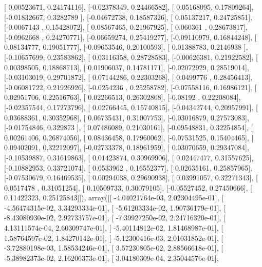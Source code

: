 \documentclass{article}
\begin{document}
       [ 0.00523671,  0.24174116],
       [-0.02378349,  0.24466582],
       [ 0.05168095,  0.17809264],
       [-0.01832667,  0.3282789 ],
       [-0.04672738,  0.18587326],
       [ 0.05137217,  0.24725851],
       [-0.0067143 ,  0.15428072],
       [ 0.08567465,  0.21967925],
       [ 0.060361  ,  0.28673817],
       [-0.0962668 ,  0.24270771],
       [-0.06659274,  0.25419277],
       [-0.09110979,  0.16844248],
       [ 0.08134777,  0.19051777],
       [-0.09653546,  0.20100593],
       [ 0.01388783,  0.2146938 ],
       [-0.10657699,  0.23583862],
       [ 0.03116358,  0.28728583],
       [-0.00626381,  0.21922582],
       [ 0.00398505,  0.18868713],
       [ 0.01906037,  0.14781171],
       [-0.02072929,  0.28519014],
       [-0.03103019,  0.29701872],
       [ 0.07144286,  0.22303268],
       [ 0.0499776 ,  0.28456413],
       [-0.06081722,  0.21926926],
       [-0.0254236 ,  0.25258782],
       [-0.07558116,  0.16986121],
       [ 0.02951706,  0.22516763],
       [ 0.02266513,  0.26302808],
       [-0.08192   ,  0.22208084],
       [-0.02357544,  0.17273796],
       [ 0.02766445,  0.15740815],
       [-0.04342744,  0.20957991],
       [ 0.03688361,  0.30352968],
       [ 0.06735431,  0.31007753],
       [-0.03016879,  0.27573083],
       [-0.01754846,  0.329873  ],
       [ 0.07486089,  0.21030161],
       [-0.09548831,  0.32254854],
       [ 0.00261406,  0.26874056],
       [ 0.08436458,  0.17960062],
       [-0.07531525,  0.15404465],
       [ 0.09402091,  0.32212097],
       [-0.02733378,  0.18961959],
       [ 0.03070659,  0.29347084],
       [-0.10539887,  0.31619863],
       [ 0.01423874,  0.30969906],
       [ 0.02447477,  0.31557625],
       [-0.10882953,  0.33721074],
       [ 0.0533962 ,  0.16552377],
       [ 0.02635161,  0.25857965],
       [-0.07530679,  0.16469535],
       [ 0.00294038,  0.29690938],
       [ 0.03991057,  0.32271343],
       [ 0.0517478 ,  0.31051254],
       [ 0.10509733,  0.30079105],
       [-0.05527452,  0.27450666],
       [ 0.11422323,  0.25125843]]), array([[ -4.04021764e-03,   2.02304495e-01],
       [ -4.56474315e-02,   3.34293334e-01],
       [ -5.61203334e-02,   1.90736179e-01],
       [ -8.43080930e-02,   2.92733757e-01],
       [ -7.39927250e-02,   2.24716320e-01],
       [  4.13111574e-04,   2.60309747e-01],
       [ -5.40114812e-02,   1.81468987e-01],
       [  1.58764597e-02,   1.84270142e-01],
       [ -5.12300416e-03,   2.01031852e-01],
       [ -3.72880198e-03,   1.58534246e-01],
       [  3.57230805e-02,   2.88566618e-01],
       [ -5.38982373e-02,   2.16206373e-01],
       [  3.04180309e-04,   2.35044576e-01],
\end{document}
